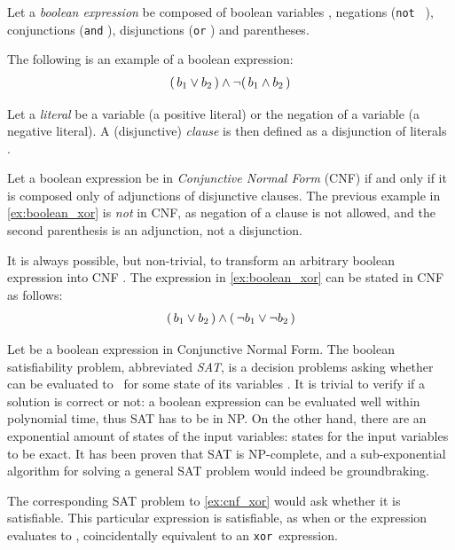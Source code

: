 Let a \emph{boolean expression} be composed of boolean variables , negations (\texttt{not } \ilmath{\neg}), conjunctions (\texttt{and} \ilmath{\land}), disjunctions (\texttt{or} \ilmath{\lor}) and parentheses.

The following is an example of a boolean expression:
\begin{align}\label{ex:boolean_xor}
	(\, b_1 \lor b_2 \,) \land \neg (\, b_1 \land b_2 \,)
\end{align}

Let a \emph{literal} be a variable  (a positive literal) or the negation of a variable  (a negative literal). A (disjunctive) \emph{clause} is then defined as a disjunction of literals . 

Let a boolean expression be in \emph{Conjunctive Normal Form} (CNF) if and only if it is composed only of adjunctions of disjunctive clauses. The previous example in \cref{ex:boolean_xor} is \emph{not} in CNF, as negation of a clause is not allowed, and the second parenthesis is an adjunction, not a disjunction.

\begin{remark}
	It is always possible, but non-trivial, to transform an arbitrary boolean expression into CNF \cite{?}. The expression in \cref{ex:boolean_xor} can be stated in CNF as follows:
	\begin{align}\label{ex:cnf_xor}
		(\, b_1 \lor b_2 \,) \land (\, \neg b_1 \lor \neg b_2 \,)
	\end{align}
\end{remark}

Let \ilmath{\varphi} be a boolean expression in Conjunctive Normal Form. The boolean satisfiability problem, abbreviated \emph{SAT}, is a decision problems asking whether \ilmath{\varphi} can be evaluated to \true\ for some state of its variables . It is trivial to verify if a solution is correct or not: a boolean expression can be evaluated well within polynomial time, thus SAT has to be in NP. On the other hand, there are an exponential amount of states of the input variables:  states for the  input variables to be exact. It has been proven that SAT is NP-complete, and a sub-exponential algorithm for solving a general SAT problem would indeed be groundbraking. 

The corresponding SAT problem to \cref{ex:cnf_xor} would ask whether it is satisfiable. This particular expression is satisfiable, as when  or  the expression evaluates to \true, coincidentally equivalent to an \texttt{xor}\ expression.

